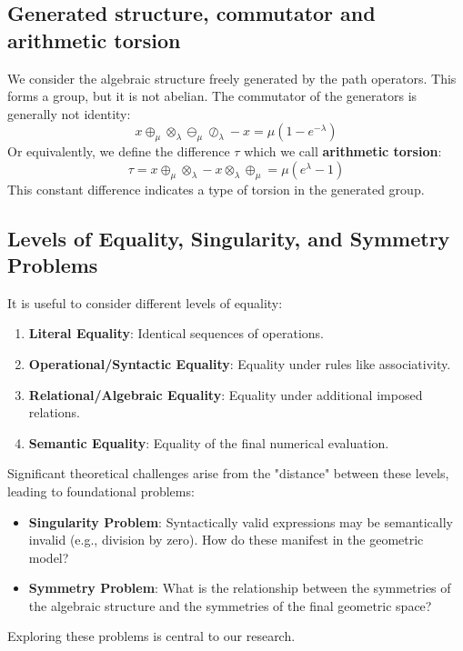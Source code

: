 \documentclass[12pt]{article}
\begin{document}
\subsection{Generated structure, commutator and arithmetic torsion}\label{subsec:generated-structure-full}
We consider the algebraic structure freely generated by the path operators. This forms a group, but it is not abelian. The commutator of the generators is generally not identity:
\begin{equation}
x \oplus_\mu \otimes_\lambda \ominus_\mu \oslash_\lambda - x = \mu(1 - e^{-\lambda})\label{eq:commutator1-full}
\end{equation}
Or equivalently, we define the difference $\tau$ which we call \textbf{arithmetic torsion}:
\begin{equation}
\tau = x \oplus_\mu \otimes_\lambda - x \otimes_\lambda \oplus_\mu = \mu(e^\lambda - 1)\label{eq:torsion-full}
\end{equation}
This constant difference indicates a type of torsion in the generated group.

\subsection{Levels of Equality, Singularity, and Symmetry Problems}
\label{subsec:problems-on-equality-singularity-symmetries-full}
It is useful to consider different levels of equality:
\begin{enumerate}
    \item \textbf{Literal Equality}: Identical sequences of operations.
    \item \textbf{Operational/Syntactic Equality}: Equality under rules like associativity.
    \item \textbf{Relational/Algebraic Equality}: Equality under additional imposed relations.
    \item \textbf{Semantic Equality}: Equality of the final numerical evaluation.
\end{enumerate}
Significant theoretical challenges arise from the "distance" between these levels, leading to foundational problems:
\begin{itemize}
    \item \textbf{Singularity Problem}: Syntactically valid expressions may be semantically invalid (e.g., division by zero). How do these manifest in the geometric model?
    \item \textbf{Symmetry Problem}: What is the relationship between the symmetries of the algebraic structure and the symmetries of the final geometric space?
\end{itemize}
Exploring these problems is central to our research.
\end{document}
